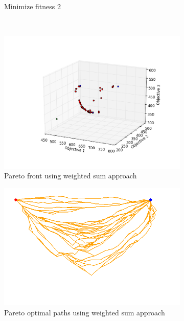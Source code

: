 \documentclass[conference]{IEEEtran}
\begin{document}
\begin{figure}
\begin{subfigure}[b]{0.31\linewidth}
		\caption{Minimize fitness 2}
		\label{fig:sim:many:fitness2}
	\end{subfigure}  \\
	\begin{subfigure}[b]{0.45\linewidth}
		\centering
		\includegraphics[width=\textwidth]{fig/sim6-3obj/PF06-MORRT.png}
		\caption{Pareto front using weighted sum approach}
		\label{fig:sim:many:pf:a}
	\end{subfigure}
	\begin{subfigure}[b]{0.45\linewidth}
		\centering
		\includegraphics[width=\textwidth]{fig/sim6-3obj/MORRTstar02-ALL.png}
		\caption{Pareto optimal paths using weighted sum approach}
		\label{fig:sim:many:sols:a}
	\end{subfigure}  \\
	\begin{subfigure}[b]{0.45\linewidth}

\end{subfigure}
\end{figure}
\end{document}

